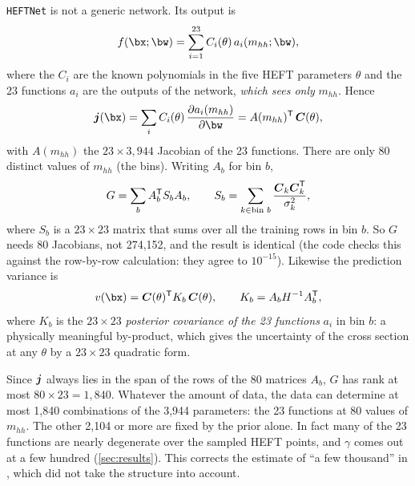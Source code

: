 \texttt{HEFTNet} is not a generic network. Its output is
\begin{equation}
  f(\bx;\bw) = \sum_{i=1}^{23} C_i(\theta)\, a_i(m_{hh};\bw) ,
  \label{eq:heftnet}
\end{equation}
where the $C_i$ are the known polynomials in the five HEFT parameters $\theta$ and the 23
functions $a_i$ are the outputs of the network, \emph{which sees only} $m_{hh}$. Hence
\begin{equation}
  \bj(\bx) = \sum_i C_i(\theta)\, \frac{\partial a_i(m_{hh})}{\partial\bw}
           = A(m_{hh})^{\mathsf T}\, \bC(\theta),
\end{equation}
with $A(m_{hh})$ the $23\times3{,}944$ Jacobian of the 23 functions. There are only 80
distinct values of $m_{hh}$ (the bins). Writing $A_b$ for bin $b$,
\begin{equation}
  G = \sum_b A_b^{\mathsf T} S_b A_b , \qquad
  S_b = \sum_{k \in \text{bin } b} \frac{\boldsymbol{C}_k \boldsymbol{C}_k^{\mathsf T}}{\sigma_k^2} ,
  \label{eq:Gfact}
\end{equation}
where $S_b$ is a $23\times23$ matrix that sums over all the training rows in bin $b$. So
$G$ needs 80 Jacobians, not 274,152, and the result is identical (the code checks this
against the row-by-row calculation: they agree to $10^{-15}$). Likewise the prediction
variance is
\begin{equation}
  v(\bx) = \bC(\theta)^{\mathsf T} K_b\, \bC(\theta), \qquad
  K_b = A_b H^{-1} A_b^{\mathsf T} ,
  \label{eq:K}
\end{equation}
where $K_b$ is the $23\times23$ \emph{posterior covariance of the 23 functions} $a_i$ in
bin $b$: a physically meaningful by-product, which gives the uncertainty of the
cross section at any $\theta$ by a $23\times23$ quadratic form.

\begin{watch}
Since $\boldsymbol{j}$ always lies in the span of the rows of the 80 matrices $A_b$, $G$ has rank at
most $80\times23 = 1{,}840$. Whatever the amount of data, the data can determine at most
1,840 combinations of the 3,944 parameters: the 23 functions at 80 values of $m_{hh}$. The
other 2,104 or more are fixed by the prior alone. In fact many of the 23 functions are
nearly degenerate over the sampled HEFT points, and $\gamma$ comes out at a few hundred
(\cref{sec:results}). This corrects the estimate of ``a few thousand'' in
, which did not take the structure into account.
\end{watch}

